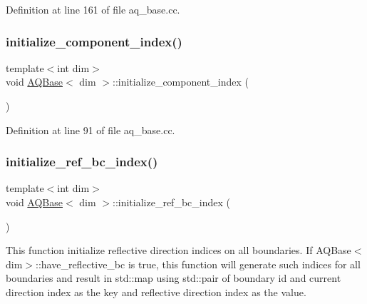 Definition at line 161 of file aq\+\_\+base.\+cc.

\mbox{\label{class_a_q_base_ab1cbcd2132328df15fb9651597e8ab48}} 
\subsubsection{\texorpdfstring{initialize\+\_\+component\+\_\+index()}{initialize\_component\_index()}}
{\footnotesize\ttfamily template$<$int dim$>$ \\
void \hyperlink{class_a_q_base}{A\+Q\+Base}$<$ dim $>$\+::initialize\+\_\+component\+\_\+index (\begin{DoxyParamCaption}{ }\end{DoxyParamCaption})\hspace{0.3cm}{\ttfamily [virtual]}}



Definition at line 91 of file aq\+\_\+base.\+cc.

\mbox{\label{class_a_q_base_aafde5b4c9ce19b1c6c4a8d37787f13b2}} 
\subsubsection{\texorpdfstring{initialize\+\_\+ref\+\_\+bc\+\_\+index()}{initialize\_ref\_bc\_index()}}
{\footnotesize\ttfamily template$<$int dim$>$ \\
void \hyperlink{class_a_q_base}{A\+Q\+Base}$<$ dim $>$\+::initialize\+\_\+ref\+\_\+bc\+\_\+index (\begin{DoxyParamCaption}{ }\end{DoxyParamCaption})\hspace{0.3cm}{\ttfamily [private]}}

This function initialize reflective direction indices on all boundaries. If A\+Q\+Base$<$dim$>$\+::have\+\_\+reflective\+\_\+bc is true, this function will generate such indices for all boundaries and result in std\+::map using std\+::pair of boundary id and current direction index as the key and reflective direction index as the value.

